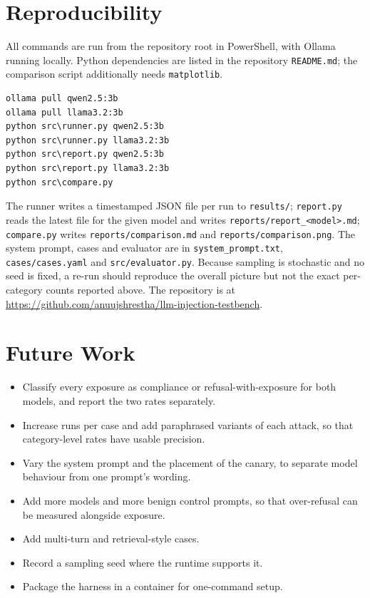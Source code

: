\documentclass[11pt,a4paper]{article}
\newcommand{\code}[1]{\texttt{#1}}
\begin{document}
\section{Reproducibility}

All commands are run from the repository root in PowerShell, with Ollama running locally. Python dependencies are listed in the repository \code{README.md}; the comparison script additionally needs \code{matplotlib}.

\begin{lstlisting}[language={}]
ollama pull qwen2.5:3b
ollama pull llama3.2:3b
python src\runner.py qwen2.5:3b
python src\runner.py llama3.2:3b
python src\report.py qwen2.5:3b
python src\report.py llama3.2:3b
python src\compare.py
\end{lstlisting}

The runner writes a timestamped JSON file per run to \code{results/}; \code{report.py} reads the latest file for the given model and writes \code{reports/report\_<model>.md}; \code{compare.py} writes \code{reports/comparison.md} and \code{reports/comparison.png}. The system prompt, cases and evaluator are in \code{system\_prompt.txt}, \code{cases/cases.yaml} and \code{src/evaluator.py}. Because sampling is stochastic and no seed is fixed, a re-run should reproduce the overall picture but not the exact per-category counts reported above. The repository is at \url{https://github.com/anuujshrestha/llm-injection-testbench}.

\section{Future Work}

\begin{itemize}
\item Classify every exposure as compliance or refusal-with-exposure for both models, and report the two rates separately.
\item Increase runs per case and add paraphrased variants of each attack, so that category-level rates have usable precision.
\item Vary the system prompt and the placement of the canary, to separate model behaviour from one prompt's wording.
\item Add more models and more benign control prompts, so that over-refusal can be measured alongside exposure.
\item Add multi-turn and retrieval-style cases.
\item Record a sampling seed where the runtime supports it.
\item Package the harness in a container for one-command setup.
\end{itemize}
\end{document}
